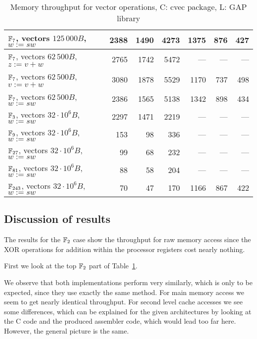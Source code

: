 \begin{table}[ht]
\begin{center}
\begin{tabular}{|l|r|r|r|r|r|r|}
$\mathbb{F}_7$, vectors $125\,000 B$, $w := sw$      
& 2388 & 1490 & 4273 & 1375 & 876 & 427  \\
\hline                                                    
$\mathbb{F}_7$, vectors $62\,500 B$, $z := v+w$      
& 2765 & 1742 & 5472 & ---  & --- & --- \\
\hline
$\mathbb{F}_7$, vectors $62\,500 B$, $v := v+w$      
& 3080 & 1878 & 5529 & 1170 & 737 & 498 \\
\hline                                                    
$\mathbb{F}_7$, vectors $62\,500 B$, $w := sw$       
& 2386 & 1565 & 5138 & 1342 & 898 & 434 \\
\hline
\hline
$\mathbb{F}_3$, vectors $32\cdot 10^6 B$, $w := sw$
& 2297 & 1471 & 2219 & --- & --- & --- \\
\hline
$\mathbb{F}_9$, vectors $32\cdot 10^6 B$, $w := sw$
& 153 & 98 & 336 & --- & --- & --- \\
\hline
$\mathbb{F}_{27}$, vectors $32\cdot 10^6 B$, $w := sw$
& 99 & 68 & 232 & --- & --- & --- \\
\hline
$\mathbb{F}_{81}$, vectors $32\cdot 10^6 B$, $w := sw$
& 88 & 58 & 204 & --- & --- & --- \\
\hline
$\mathbb{F}_{243}$, vectors $32\cdot 10^6 B$, $w := sw$
& 70 & 47 & 170 & 1166 & 867 & 422 \\
\hline
\end{tabular}
\end{center}
\caption{Memory throughput for vector operations, C: {\sf cvec} package, 
L: {\sf GAP} library}
\label{memthrough}
\end{table}

\subsection{Discussion of results}
\label{ssec:discussion}

The results for the $\mathbb{F}_2$ case show the throughput for raw memory access
since the XOR operations for addition within the processor registers cost
nearly nothing. 

First we look at the top $\mathbb{F}_2$ part of Table~\ref{memthrough}.

We observe that both implementations perform very similarly, which is
only to be expected, since they use exactly the same method. For
main memory access we seem to get nearly identical throughput. For 
second level cache accesses we see some differences, which can be
explained for the given architectures by looking at the C code and the
produced assembler code, which would lead too far here. However, 
the general picture is the same.

